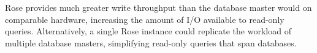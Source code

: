 \documentclass{vldb}
\newcommand{\rows}{Rose\xspace}
\newcommand{\rowss}{Rose's\xspace}
\begin{document}
\rows provides much greater write throughput than the database master
would on comparable hardware, increasing the amount of I/O available to
read-only queries.  Alternatively, a single \rows instance
could replicate the workload of multiple database masters,
simplifying read-only queries that span databases.






\end{document}
